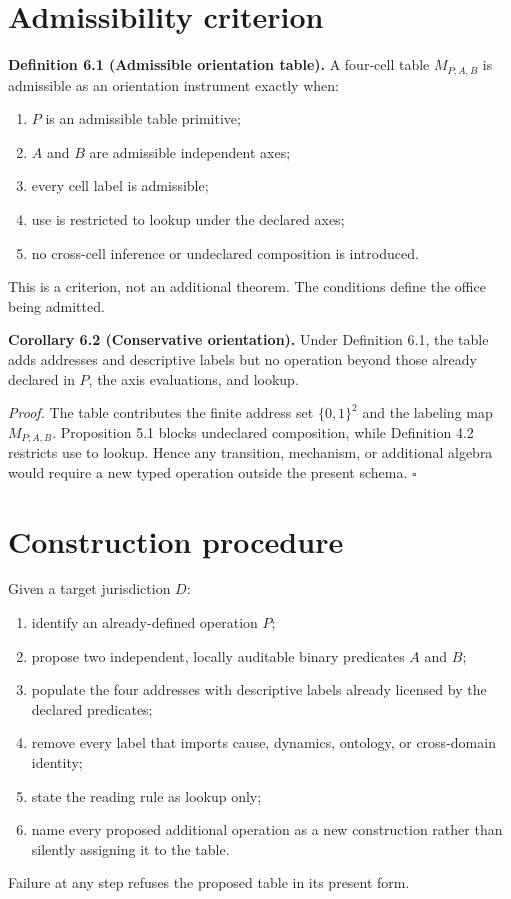 \documentclass[11pt]{article}
\begin{document}
\section{Admissibility criterion}

\textbf{Definition 6.1 (Admissible orientation table).}
A four-cell table $M_{P;A,B}$ is admissible as an orientation instrument exactly when:
\begin{enumerate}
\item $P$ is an admissible table primitive;
\item $A$ and $B$ are admissible independent axes;
\item every cell label is admissible;
\item use is restricted to lookup under the declared axes;
\item no cross-cell inference or undeclared composition is introduced.
\end{enumerate}

This is a criterion, not an additional theorem. The conditions define the office being admitted.

\textbf{Corollary 6.2 (Conservative orientation).}
Under Definition 6.1, the table adds addresses and descriptive labels but no operation beyond those already declared in $P$, the axis evaluations, and lookup.

\textit{Proof.}
The table contributes the finite address set $\{0,1\}^2$ and the labeling map $M_{P;A,B}$. Proposition 5.1 blocks undeclared composition, while Definition 4.2 restricts use to lookup. Hence any transition, mechanism, or additional algebra would require a new typed operation outside the present schema. $\square$

\section{Construction procedure}

Given a target jurisdiction $D$:
\begin{enumerate}
\item identify an already-defined operation $P$;
\item propose two independent, locally auditable binary predicates $A$ and $B$;
\item populate the four addresses with descriptive labels already licensed by the declared predicates;
\item remove every label that imports cause, dynamics, ontology, or cross-domain identity;
\item state the reading rule as lookup only;
\item name every proposed additional operation as a new construction rather than silently assigning it to the table.
\end{enumerate}
Failure at any step refuses the proposed table in its present form.
\end{document}
